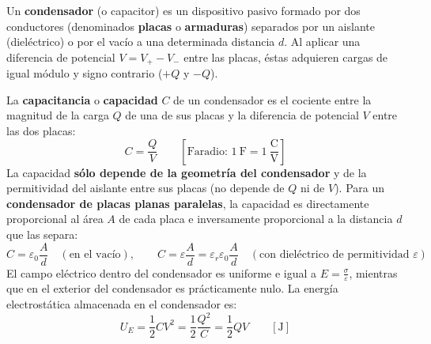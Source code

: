 Un \textbf{condensador} (o capacitor) es un dispositivo pasivo formado por dos conductores (denominados \textbf{placas} o \textbf{armaduras}) separados por un aislante (dieléctrico) o por el vacío a una determinada distancia $d$. Al aplicar una diferencia de potencial $V = V_+ - V_-$ entre las placas, éstas adquieren cargas de igual módulo y signo contrario ($+Q$ y $-Q$).

\begin{definicion}
La \textbf{capacitancia} o \textbf{capacidad} $C$ de un condensador es el cociente entre la magnitud de la carga $Q$ de una de sus placas y la diferencia de potencial $V$ entre las dos placas:
\begin{equation}
    C = \frac{Q}{V} \qquad \left[\text{Faradio: } 1\ \si{\farad} = 1\ \frac{\si{\coulomb}}{\si{\volt}}\right]
\end{equation}
La capacidad \textbf{sólo depende de la geometría del condensador} y de la permitividad del aislante entre sus placas (no depende de $Q$ ni de $V$). Para un \textbf{condensador de placas planas paralelas}, la capacidad es directamente proporcional al área $A$ de cada placa e inversamente proporcional a la distancia $d$ que las separa:
\begin{equation}
    C = \varepsilon_0 \frac{A}{d}\quad (\text{en el vacío}), \qquad C = \varepsilon \frac{A}{d} = \varepsilon_r \varepsilon_0 \frac{A}{d}\quad (\text{con dieléctrico de permitividad } \varepsilon)
\end{equation}
El campo eléctrico dentro del condensador es uniforme e igual a $E = \frac{\sigma}{\varepsilon}$, mientras que en el exterior del condensador es prácticamente nulo. La energía electrostática almacenada en el condensador es:
\begin{equation}
    U_E = \frac{1}{2} C V^2 = \frac{1}{2} \frac{Q^2}{C} = \frac{1}{2} Q V \qquad [\si{\joule}]
\end{equation}
\end{definicion}

